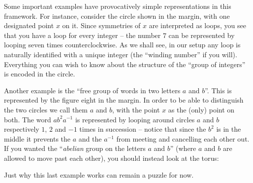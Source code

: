 Some important examples have provocatively simple representations in
this framework.  For instance, consider the circle shown in the margin,
with one designated point $x$ on it.
Since symmetries of $x$ are interpreted as loops, you see that you have a loop for every integer -- the number $7$ can be represented by looping seven times counterclockwise.  As we shall see, in our setup any loop  is naturally identified with a unique integer (the ``winding number'' if you will).  Everything you can wish to know about the structure of the ``group of integers'' is encoded in the circle.

Another example is the ``free group of words in two letters $a$ and $b$''.  This is represented by the figure eight in the margin.
In order to be able to distinguish the two circles we call them $a$ and $b$,
with the point $x$ as the (only) point on both.
The word $ab^2a^{-1}$ is represented by looping around circles $a$ and $b$ respectively $1$, $2$ and $-1$ times in succession -- notice that since the $b^2$ is in the middle it prevents the $a$ and the $a^{-1}$ from meeting and cancelling each other out.  If you wanted the ``\emph{abelian} group on the letters $a$ and $b$'' (where $a$ and $b$ are allowed to move past each other), you should instead look at the torus:
\begin{center}
\end{center}
Just why this last example works can remain a puzzle for now.

